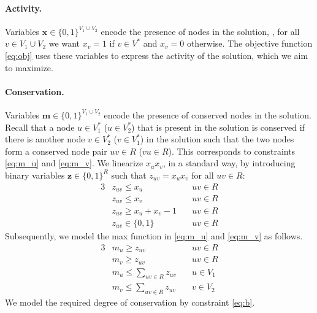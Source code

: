 		\paragraph{Activity.} Variables $\mathbf{x} \in \{0, 1\}^{V_1 \cup V_2}$
		encode the presence of nodes in the solution, \ie, for all $v \in V_1 \cup
		V_2$ we want $x_v = 1$ if $v \in V^*$ and $x_v = 0$ otherwise. The objective
		function \eqref{eq:obj} uses these variables to express the activity of the
		solution, which we aim to maximize.

		\paragraph{Conservation.} Variables $\mathbf{m} \in \{0, 1\}^{V_1 \cup V_2}$
		encode the presence of conserved nodes in the solution. Recall that a
		node $u \in V_1^*$ ($u \in V_2^*$) that is present in the solution is conserved if there
		is another node $v \in V_2^*$ ($v \in V_1^*$) in the solution such that the two
		nodes form a conserved node pair $uv \in R$ ($vu \in R$). This corresponds to
		constraints \eqref{eq:m_u} and \eqref{eq:m_v}. We linearize $x_ux_v$,
		in a standard way, by introducing
		binary variables $\mathbf{z} \in \{0,1\}^R$ such that $z_{uv} =
		x_ux_v$ for all $uv \in R$:
		\allowdisplaybreaks
		\begin{alignat}{3}
		\label{eq:z1} & z_{uv} \leq x_u                 & uv \in R\\
		\label{eq:z2} & z_{uv} \leq x_v                 & uv \in R\\
		\label{eq:z3} & z_{uv} \geq x_u + x_v - 1 \quad & uv \in R\\
		\label{eq:vars2} & z_{uv} \in \{0,1\} & uv \in R
		\end{alignat}
		Subsequently, we model the max function in \eqref{eq:m_u} and \eqref{eq:m_v} as
		follows.
		\allowdisplaybreaks
		\begin{alignat}{3}
		\label{eq:m1}             & m_u \geq z_{uv}                 & uv \in R\\
		\label{eq:m1b}            & m_v \geq z_{uv}                 & uv \in R\\
		\label{eq:m2}             & m_u \leq \sum_{uv \in R}z_{uv}\quad  & u \in V_1\\
		\label{eq:m3}             & m_v \leq \sum_{uv \in R}z_{uv}  & v \in V_2
		\end{alignat}
		We model the required degree of conservation by constraint \eqref{eq:b}.

